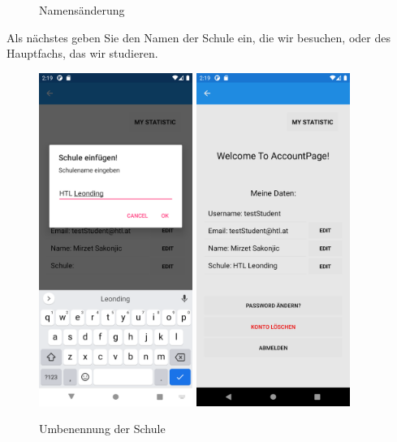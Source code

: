 \begin{figure}[h]
\begin{center}
    \caption[MyAccount Namensänderung]{Namensänderung}
    \end{center}
\end{figure}
\newpage
Als nächstes geben Sie den Namen der Schule ein, die wir besuchen, oder des Hauptfachs, das wir studieren.
\begin{figure}[h]
    \begin{center}
    \includegraphics[width=5cm]{pics/Xamarin Student/17 School.png}\hfill
    \includegraphics[width=5cm]{pics/Xamarin Student/18 School success.png}
    \caption[MyAccount Umbenennung der Schule]{Umbenennung der Schule}
    \end{center}
\end{figure}
